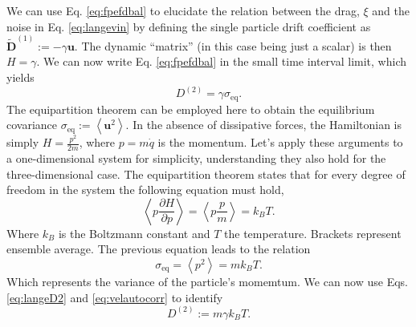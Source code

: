 \documentclass[twoside,openright,titlepage,numbers=noenddot,%
headinclude,footinclude,cleardoublepage=empty,abstract=on,
BCOR=5mm,fontsize=11pt, dvipsnames, paper=b5
]{scrreprt}
\renewcommand{\vec}[1]{\bm{#1}}
\newcommand{\kT}{k_B T}
\newcommand{\ppos}{q}
\newcommand{\pvel}{u}
\begin{document}
We can use Eq. \eqref{eq:fpefdbal} to elucidate the relation between the drag, $\xi$ and the noise in Eq. \eqref{eq:langevin} by defining the single particle drift coefficient as $\widetilde{\vec{D}}^{(1)} := -\gamma \vec{\pvel}$. The dynamic ``matrix'' (in this case being just a scalar) is then $H = \gamma$. We can now write Eq. \eqref{eq:fpefdbal} in the small time interval limit, which yields
\begin{equation}
  \label{eq:langeD2}
  D^{(2)} = \gamma\sigma_{\text{eq}}.
\end{equation}
The equipartition theorem can be employed here to obtain the equilibrium covariance $\sigma_{\text{eq}} := \left\langle\vec{\pvel}^2\right\rangle$.
In the absence of dissipative forces, the Hamiltonian is simply $H = \frac{p^2}{2m}$, where $p = m\dot{\ppos}$ is the momentum.
Let's apply these arguments to a one-dimensional system for simplicity, understanding they also hold for the three-dimensional case. The equipartition theorem states that for every degree of freedom in the system the following equation must hold,
\begin{equation}
  \left\langle p \frac{\partial H}{\partial p}\right\rangle = \left\langle p \frac{p}{m}\right\rangle = k_BT.
\end{equation}
Where $k_B$ is the Boltzmann constant and $T$ the temperature. Brackets represent ensemble average.
The previous equation leads to the relation
\begin{equation}
  \label{eq:velautocorr}
  \sigma_{\text{eq}} = \left\langle p^2\right\rangle = m k_BT.
\end{equation}
Which represents the variance of the particle's momemtum. We can now use Eqs. \eqref{eq:langeD2} and \eqref{eq:velautocorr} to identify
\begin{equation}
  \label{eq:langenoiseamp}
  D^{(2)} := m\gamma\kT.
\end{equation}
\end{document}
